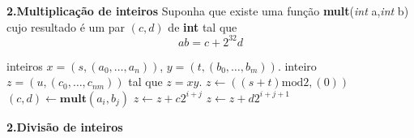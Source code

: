 \documentclass{beamer}
\begin{document}
\begin{frame}[fragile]{\bf 2.}{\bf Multiplicação de inteiros}
Suponha que existe uma função {\bf mult}({\it int} a,{\it int} b) cujo resultado é um par $(c,d)$ de {\bf int} tal que 
$$ab = c + 2^{32}d$$

\begin{algorithmic}
\REQUIRE inteiros $x=(s,(a_0,\ldots, a_n))$, $y=(t,(b_0,\ldots, b_m))$.
\ENSURE inteiro $z=(u, (c_0, \ldots, c_{nm}))$ tal que $z=xy$.
\STATE $z \leftarrow ( (s+t)\mathrm{mod} 2, (0))$ 
  \STATE $(c,d)\leftarrow {\mathbf{mult}}(a_i,b_j)$
  \STATE $z \leftarrow z + c 2^{i+j}$
  \STATE $z \leftarrow z + d 2^{i+j+1}$
 \ENDFOR
\ENDFOR
\end{algorithmic}

\end{frame}

\begin{frame}{\bf 2.}{\bf Divisão de inteiros}
 
\end{frame}
\end{document}
